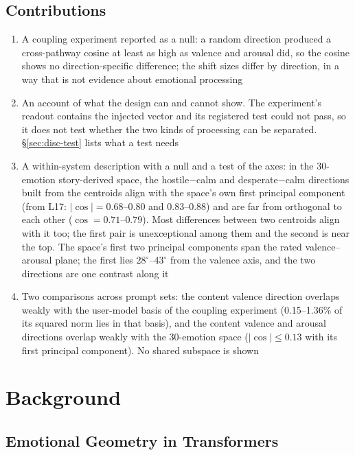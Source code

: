\documentclass[11pt,a4paper]{article}
\begin{document}
\subsection*{Contributions}

\begin{enumerate}
  \item A coupling experiment reported as a null: a random direction produced a cross-pathway cosine at least as high as valence and arousal did, so the cosine shows no direction-specific difference; the shift sizes differ by direction, in a way that is not evidence about emotional processing
  \item An account of what the design can and cannot show. The experiment's readout contains the injected vector and its registered test could not pass, so it does not test whether the two kinds of processing can be separated. \S\ref{sec:disc-test} lists what a test needs
  \item A within-system description with a null and a test of the axes: in the 30-emotion story-derived space, the hostile$-$calm and desperate$-$calm directions built from the centroids align with the space's own first principal component (from L17: $|\cos| = 0.68$--$0.80$ and $0.83$--$0.88$) and are far from orthogonal to each other ($\cos = 0.71$--$0.79$). Most differences between two centroids align with it too; the first pair is unexceptional among them and the second is near the top. The space's first two principal components span the rated valence--arousal plane; the first lies $28^\circ$--$43^\circ$ from the valence axis, and the two directions are one contrast along it
  \item Two comparisons across prompt sets: the content valence direction overlaps weakly with the user-model basis of the coupling experiment (0.15--1.36\% of its squared norm lies in that basis), and the content valence and arousal directions overlap weakly with the 30-emotion space ($|\cos| \le 0.13$ with its first principal component). No shared subspace is shown
\end{enumerate}

\section{Background}
\label{sec:background}

\subsection{Emotional Geometry in Transformers}
\label{sec:emo-geom}
\end{document}
